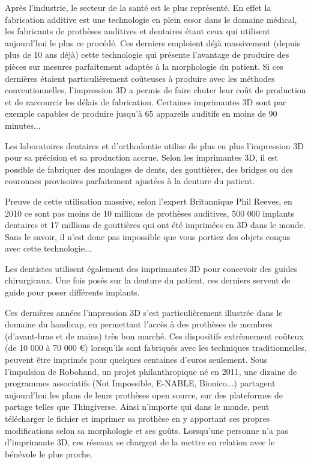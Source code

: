 \documentclass{article}
\begin{document}
Après l'industrie, le secteur de la santé est le plus représenté. En effet la fabrication additive est une technologie en plein essor dans le domaine médical, les fabricants de prothèses auditives et dentaires étant ceux qui utilisent aujourd'hui le plus ce procédé. Ces derniers emploient déjà massivement (depuis plus de 10 ans déjà) cette technologie qui présente l'avantage de produire des pièces sur mesures parfaitement adaptés à la morphologie du patient. Si ces dernières étaient particulièrement coûteuses à produire avec les méthodes conventionnelles, l'impression 3D a permis de faire chuter leur coût de production et de raccourcir les délais de fabrication. Certaines imprimantes 3D sont par exemple capables de produire jusqu'à 65 appareils auditifs en moins de 90 minutes... \hfill
 \par\leavevmode\par
Les laboratoires dentaires et d'orthodontie utilise de plus en plus l'impression 3D pour sa précision et sa production accrue. Selon les imprimantes 3D, il est possible de fabriquer des moulages de dents, des gouttières, des bridges ou des couronnes provisoires parfaitement ajustées à la denture du patient.\hfill
 \par\leavevmode\par
Preuve de cette utilisation massive, selon l'expert Britannique Phil Reeves, en 2010 ce sont pas moins de 10 millions de prothèses auditives, 500 000 implants dentaires et 17 millions de gouttières qui ont été imprimées en 3D dans le monde. Sans le savoir, il n'est donc pas impossible que vous portiez des objets conçus avec cette technologie...\hfill
 \par\leavevmode\par
Les dentistes utilisent également des imprimantes 3D pour concevoir des guides chirurgicaux. Une fois posés sur la denture du patient, ces derniers servent de guide pour poser différents implants.\hfill
 \par\leavevmode\par
Ces dernières années l'impression 3D s'est particulièrement illustrée dans le domaine du handicap, en permettant l'accès à des prothèses de membres (d'avant-bras et de mains) très bon marché. Ces dispositifs extrêmement coûteux (de 10 000 à 70 000 \euro) lorsqu'ils sont fabriqués avec les techniques traditionnelles, peuvent être imprimés pour quelques centaines d'euros seulement. Sous l'impulsion de Robohand, un projet philanthropique né en 2011, une dizaine de programmes associatifs (Not Impossible, E-NABLE, Bionico...) partagent aujourd'hui les plans de leurs prothèses open source, sur des plateformes de partage telles que Thingiverse. Ainsi n'importe qui dans le monde, peut télécharger le fichier et imprimer sa prothèse en y apportant ses propres modifications selon sa morphologie et ses goûts. Lorsqu'une personne n'a pas d'imprimante 3D, ces réseaux se chargent de la mettre en relation avec le bénévole le plus proche.
\end{document}
